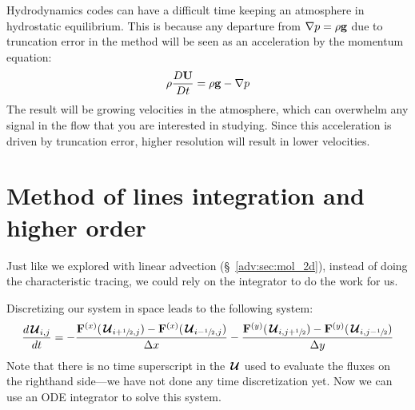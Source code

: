 Hydrodynamics codes can have a difficult time keeping an atmosphere in
hydrostatic equilibrium.  This is because any departure from $\nabla p
= \rho {\bf g}$ due to truncation error in the method will be seen as an
acceleration by the momentum equation:
\begin{equation}
\rho {\frac{{D{\bf U}}}{D t}} = \rho {\bf g} - \nabla p
\end{equation}
The result will be growing velocities in the atmosphere, which can
overwhelm any signal in the flow that you are interested in studying.
Since this acceleration is driven by truncation error, higher
resolution will result in lower velocities.





\fi


\section{Method of lines integration and higher order}
\label{sec:comp:mol}
Just like we explored with linear advection (\S~\ref{adv:sec:mol_2d}),
instead of doing the characteristic tracing, we could rely on the
integrator to do the work for us.


Discretizing our system in space leads to the following system:
\begin{equation}
\frac{d{\,\boldsymbol{\mathcal{U}}}_{i,j}}{dt} = -\frac{{\bf F}^{(x)}({\,\boldsymbol{\mathcal{U}}}_{i+{\sfrac{1}{2}},j}) - {\bf F}^{(x)}({\,\boldsymbol{\mathcal{U}}}_{i-{\sfrac{1}{2}},j})}{\Delta x}
                      -\frac{{\bf F}^{(y)}({\,\boldsymbol{\mathcal{U}}}_{i,j+{\sfrac{1}{2}}}) - {\bf F}^{(y)}({\,\boldsymbol{\mathcal{U}}}_{i,j-{\sfrac{1}{2}}})}{\Delta y}
\end{equation}
Note that there is no time superscript in the ${\,\boldsymbol{\mathcal{U}}}$ used to evaluate the
fluxes on the righthand side---we have not done any time
discretization yet.  Now we can use an ODE integrator to solve this system.

